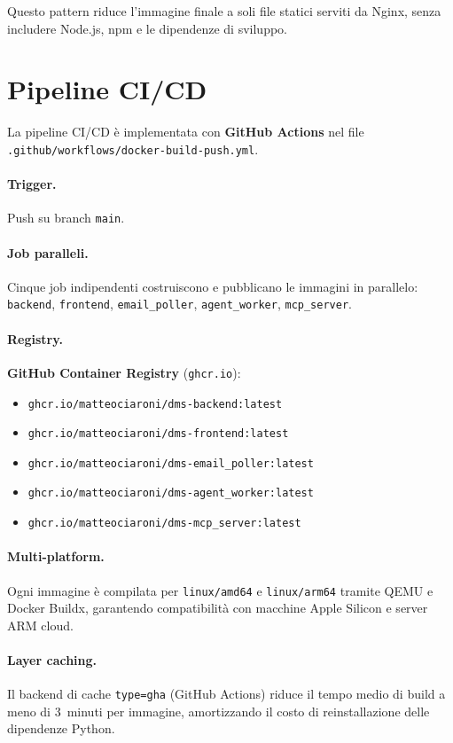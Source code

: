 Questo pattern riduce l'immagine finale a soli file statici serviti da Nginx,
senza includere Node.js, npm e le dipendenze di sviluppo.

\section{Pipeline CI/CD}
\label{sec:cicd}

La pipeline CI/CD \`e implementata con \textbf{GitHub Actions} nel file
\texttt{.github/workflows/docker-build-push.yml}.

\paragraph{Trigger.} Push su branch \texttt{main}.

\paragraph{Job paralleli.} Cinque job indipendenti costruiscono e pubblicano
le immagini in parallelo: \texttt{backend}, \texttt{frontend}, \texttt{email\_poller},
\texttt{agent\_worker}, \texttt{mcp\_server}.

\paragraph{Registry.} \textbf{GitHub Container Registry} (\texttt{ghcr.io}):
\begin{itemize}[leftmargin=*]
    \item \texttt{ghcr.io/matteociaroni/dms-backend:latest}
    \item \texttt{ghcr.io/matteociaroni/dms-frontend:latest}
    \item \texttt{ghcr.io/matteociaroni/dms-email\_poller:latest}
    \item \texttt{ghcr.io/matteociaroni/dms-agent\_worker:latest}
    \item \texttt{ghcr.io/matteociaroni/dms-mcp\_server:latest}
\end{itemize}

\paragraph{Multi-platform.} Ogni immagine \`e compilata per \texttt{linux/amd64} e
\texttt{linux/arm64} tramite QEMU e Docker Buildx, garantendo compatibilit\`a con
macchine Apple Silicon e server ARM cloud.

\paragraph{Layer caching.} Il backend di cache \texttt{type=gha} (GitHub Actions)
riduce il tempo medio di build a meno di 3~minuti per immagine, amortizzando il
costo di reinstallazione delle dipendenze Python.

